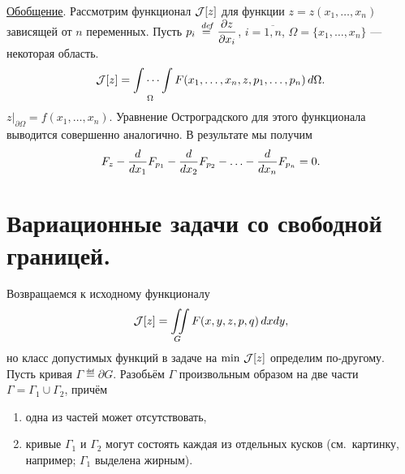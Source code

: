 \noindent\underline{Обобщение}. Рассмотрим функционал $\mathcal{J}[z]$ для функции $z=z(x_1,\ldots,x_n)$ зависящей от $n$ переменных. Пусть $\displaystyle p_i\stackrel{\hspace{0.09 cm}de\!f}{=}\frac{\partial z}{\partial x_i}$, $i=\overline{1,n}$, $\Omega=\{x_1,\ldots,x_n\}$ --- некоторая область.
\begin{equation*}
	\hfill\J[z]=\idotsint\limits_{\Omega}F(x_1,\ldots,x_n,z,p_1,\ldots,p_n)\,d\Omega.\hfill
\end{equation*}
$z\Big|_{\partial\Omega}=f(x_1,\ldots,x_n)$. Уравнение Остроградского для этого функционала выводится совершенно аналогично. В результате мы получим 
\begin{equation*}
	\hfill F_z-\der{}{x_1}F_{p_1}-\der{}{x_2}F_{p_2}-\ldots-\der{}{x_n}F_{p_n}=0.\hfill
\end{equation*}
\section{Вариационные задачи со свободной границей.}
\label{lecture9section3}
Возвращаемся к исходному функционалу
\begin{equation*}
	\hfill\J[z]=\iint\limits_{G}F(x,y,z,p,q)\,dxdy,\hfill
\end{equation*}
но класс допустимых функций в задаче на $\min\,\mathcal{J}[z]$ определим по-другому. Пусть кривая $\Gamma\eqdef\partial G$. Разобьём $\Gamma$ произвольным образом на две части $\Gamma=\Gamma_1\cup \Gamma_2$, причём 
\begin{enumerate}
	\item одна из частей может отсутствовать,
	\item кривые $\Gamma_1$ и $\Gamma_2$ могут состоять каждая из отдельных кусков (см.~картинку, например; $\Gamma_1$ выделена жирным).
\end{enumerate} 


